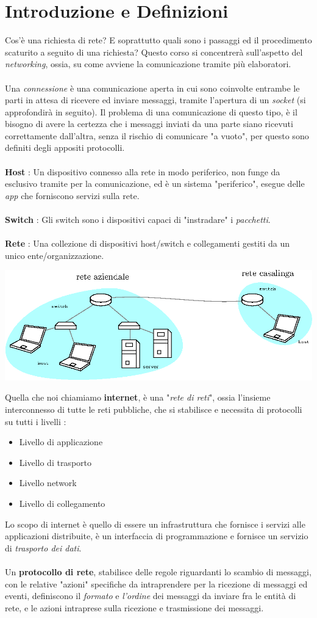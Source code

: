 \documentclass[12pt, letterpaper]{article}
\newcommand{\acc}{\\\hphantom{}\\}
\begin{document}
\section{Introduzione e Definizioni}
Cos'è una richiesta di rete? E soprattutto quali sono i passaggi ed il procedimento scaturito a seguito di una richiesta? Questo corso 
si concentrerà sull'aspetto del \textit{networking}, ossia, su come avviene la comunicazione tramite più elaboratori.\acc 
Una \textit{connessione} è una comunicazione aperta in cui sono coinvolte entrambe le parti in attesa di ricevere ed inviare 
messaggi, tramite l'apertura di un \textit{socket} (si approfondirà in seguito). Il problema di una comunicazione di questo tipo, 
è il bisogno di avere la certezza che i messaggi inviati da una parte siano ricevuti correttamente dall'altra, senza il rischio di 
comunicare "a vuoto", per questo sono definiti degli appositi protocolli.\acc 
\textbf{Host} : Un dispositivo connesso alla rete in modo periferico, non funge da esclusivo tramite per la comunicazione, 
ed è un sistema "periferico", esegue delle \textit{app} che forniscono servizi sulla rete.\acc 
\textbf{Switch} : Gli switch sono i dispositivi capaci di "instradare" i \textit{pacchetti}.\acc
\textbf{Rete} : Una collezione di dispositivi host/switch e collegamenti gestiti da un unico ente/organizzazione.\begin{center}
    \includegraphics[width=1\textwidth ]{images/reteDef.eps}
\end{center}
Quella che noi chiamiamo \textbf{internet}, è una "\textit{rete di reti}", ossia l'insieme interconnesso di tutte le reti 
pubbliche, che si stabilisce e necessita di protocolli su tutti i livelli : \begin{itemize}
    \item Livello di applicazione
    \item Livello di trasporto 
    \item Livello network 
    \item Livello di collegamento
\end{itemize}
Lo scopo di internet è quello di essere un infrastruttura che fornisce i servizi alle applicazioni distribuite, è 
un interfaccia di programmazione e fornisce un servizio di \textit{trasporto dei dati}.\acc 
Un \textbf{protocollo di rete}, stabilisce delle regole riguardanti lo scambio di messaggi, con le relative "azioni" specifiche 
da intraprendere per la ricezione di messaggi ed eventi, definiscono il \textit{formato} e \textit{l'ordine} dei messaggi 
da inviare fra le entità di rete, e le azioni intraprese sulla ricezione e trasmissione dei messaggi.
\end{document}
